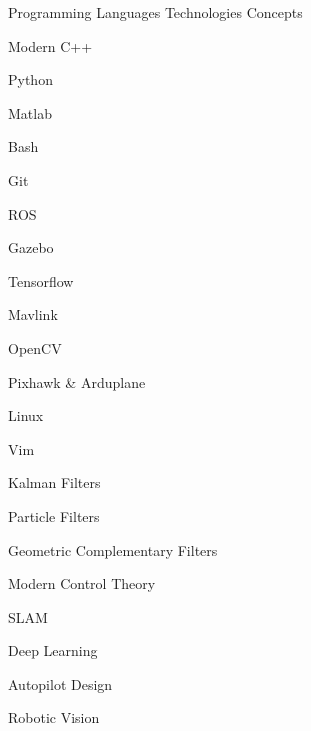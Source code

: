
\begin{cventries}

  \cventrycol
  {Programming Languages}
  {Technologies}
  {Concepts}
  {
    \begin{cvitems}
      \item {Modern C++}
      \item {Python}
      \item {Matlab}
      \item {Bash}
    \end{cvitems}
  }
  {
    \begin{cvitems}
      \item {Git}
      \item {ROS}
      \item {Gazebo}
      \item {Tensorflow}
      \item {Mavlink}
      \item {OpenCV}
      \item {Pixhawk \& Arduplane}
      \item {Linux}
      \item {Vim}
    \end{cvitems}
  }
  {
    \begin{cvitems}
      \item {Kalman Filters}
      \item {Particle Filters}
      \item {Geometric Complementary Filters}
      \item {Modern Control Theory}
      \item {SLAM}
      \item {Deep Learning}
      \item {Autopilot Design}
      \item {Robotic Vision}
    \end{cvitems}
  }

\end{cventries}
